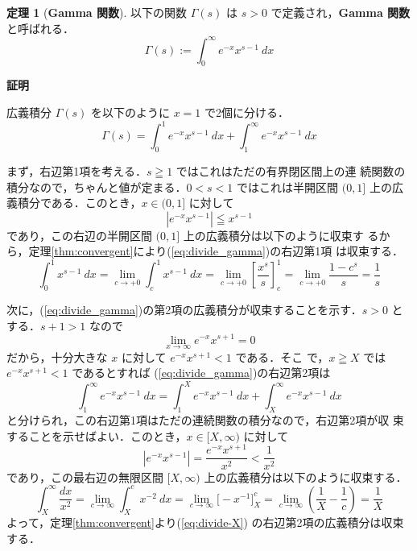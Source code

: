 \documentclass[10pt, uplatex, dvipdfmx]{jsarticle}
\makeatletter
\renewenvironment{proof}[1][\proofname]{\par
  \pushQED{\qed}%
  \normalfont \topsep6\p@\@plus6\p@\relax
  \trivlist
  \item\relax
  {\bfseries
  #1\@addpunct{.}}\hspace\labelsep\ignorespaces
}{%
  \popQED\endtrivlist\@endpefalse
}
\theoremstyle{definition}
\newtheorem{theorem}{定理}[section]
\renewcommand{\proofname}{\textbf{証明}}
\numberwithin{equation}{section}
\makeatother
\begin{document}
\begin{theorem}[\textbf{Gamma 関数}]
  以下の関数 $\varGamma(s)$ は $s>0$ で定義され，\textbf{Gamma 関数} と呼ばれる．
  \[
    \varGamma(s) := \int_{0}^{\infty} e^{-x} x^{s-1} \ dx
  \]
\end{theorem}

\begin{proof}
  広義積分 $\varGamma(s)$ を以下のように $x=1$ で2個に分ける．
  \begin{equation}\label{eq:divide_gamma}
    \varGamma(s) = \int_{0}^{1} e^{-x} x ^{s-1}  \ dx  + \int_{1}^{\infty} e^{-x} x^{s-1} \ dx
  \end{equation}
  
  まず，右辺第1項を考える．$s \geqq 1$ ではこれはただの有界閉区間上の連
  続関数の積分なので，ちゃんと値が定まる．$0<s<1$ ではこれは半開区間 $(0,
  1]$ 上の広義積分である．このとき，$x \in (0, 1]$ に対して
  \[
    \left| e^{-x} x^{s-1}\right|  \leqq x^{s-1}
  \]
  であり，この右辺の半開区間 $(0, 1]$ 上の広義積分は以下のように収束す
  るから，定理\ref{thm:convergent}により(\ref{eq:divide_gamma})の右辺第1項
  は収束する．
  \[
    \int_{0}^{1} x^{s-1} \ dx = \lim_{c \to +0} \int_{c}^{1} x^{s-1} \
    dx = \lim_{c \to +0} \left[ \frac{x^{s}}{s}\right]_{c}^{1}
    = \lim_{c \to +0} \frac{1-c^s}{s} = \frac{1}{s}
  \]

  次に，(\ref{eq:divide_gamma})の第2項の広義積分が収束することを示す．$s >0$ とする．$s+1>1$ なので
  \[
    \lim_{x \to \infty} e^{-x} x^{s+1} = 0
  \]
  だから，十分大きな $x$ に対して $e^{-x} x^{s+1} <1 $ である．そこ
  で，$x \geqq X$ では $e^{-x} x^{s+1} <1$ であるとすれば (\ref{eq:divide_gamma})の右辺第2項は
  \begin{equation}\label{eq:divide-X}
    \int_{1}^{\infty} e^{-x}x^{s-1} \ dx = \int_{1}^{X} e^{-x}x^{s-1} \ dx + \int_{X}^{\infty} e^{-x} x^{s-1} \ dx
  \end{equation}
  と分けられ，この右辺第1項はただの連続関数の積分なので，右辺第2項が収
  束することを示せばよい．このとき，$x \in [X, \infty)$ に対して
  \[
    \left| e^{-x} x^{s-1}\right| = \frac{e^{-x}x^{s+1}}{x^2} < \frac{1}{x^2}
  \]
  であり，この最右辺の無限区間 $[X, \infty)$ 上の広義積分は以下のように収束する．
  \[
    \int_{X}^{\infty} \frac{dx}{x^2} = \lim_{c \to \infty} \int_{X}^{c} x^{-2} \ dx = \lim_{ c \to \infty} \Big[-x^{-1} \Big]_{X}^{c}
    = \lim_{c \to \infty} \left( \frac{1}{X} - \frac{1}{c}\right) = \frac{1}{X}
  \]
  よって，定理\ref{thm:convergent}より(\ref{eq:divide-X}) の右辺第2項の広義積分は収束する．
\end{proof}
\end{document}
